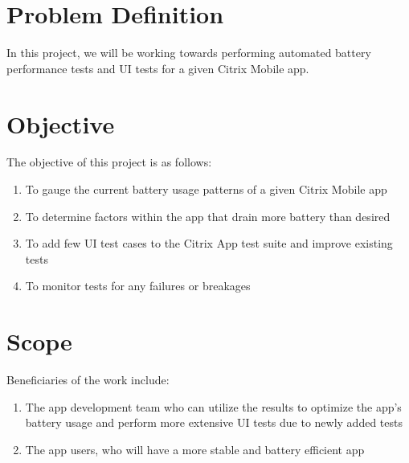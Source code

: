 \section{Problem Definition}	
In this project, we will be working towards performing automated battery performance tests and UI tests for a given Citrix Mobile app.
\section{Objective}
The objective of this project is as follows:
\begin{enumerate}
	\item To gauge the current battery usage patterns of a given Citrix Mobile app
	\item To determine factors within the app that drain more battery than desired
	\item To add few UI test cases to the Citrix App test suite and improve existing tests
	\item To monitor tests for any failures or breakages
\end{enumerate}
\section{Scope}
Beneficiaries of the work include:
\begin{enumerate}
	\item The app development team who can utilize the results to optimize the app’s battery usage and perform more extensive UI tests due to newly added tests
	\item The app users, who will have a more stable and battery efficient app
\end{enumerate}
 